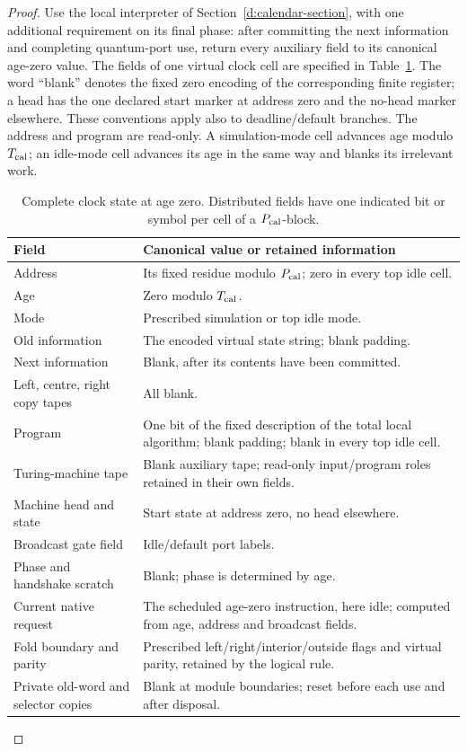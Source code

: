 \begin{proof}
Use the local interpreter of Section~\ref{d:calendar-section}, with
one additional requirement on its final phase: after committing the
next information and completing quantum-port use, return every
auxiliary field to its canonical age-zero value. The fields of one
virtual clock cell are specified in Table~\ref{f4:fields}. The
word ``blank'' denotes the fixed zero encoding of the corresponding
finite register; a head has the one declared start marker at address
zero and the no-head marker elsewhere. These conventions apply also
to deadline/default branches. The address and program are read-only.
A simulation-mode cell advances age modulo \(T_{\rm cal}\); an idle-mode cell
advances its age in the same way and blanks its irrelevant work.

\begin{table}[!htp]
\caption{Complete clock state at age zero. Distributed fields have
one indicated bit or symbol per cell of a \(P_{\rm cal}\)-block.}\label{f4:fields}
\small\centering
\begin{tabular}{@{}p{}>{\raggedright\arraybackslash}p{}@{}}
\toprule Field & Canonical value or retained information\\\midrule
Address & Its fixed residue modulo \(P_{\rm cal}\); zero in every top idle cell.\\\addlinespace[3pt]
Age & Zero modulo \(T_{\rm cal}\).\\\addlinespace[3pt]
Mode & Prescribed simulation or top idle mode.\\\addlinespace[3pt]
Old information & The encoded virtual state string; blank padding.\\\addlinespace[3pt]
Next information & Blank, after its contents have been committed.\\\addlinespace[3pt]
Left, centre, right copy tapes & All blank.\\\addlinespace[3pt]
Program & One bit of the fixed description of the total local algorithm;
blank padding; blank in every top idle cell.\\\addlinespace[3pt]
Turing-machine tape & Blank auxiliary tape; read-only input/program roles retained
in their own fields.\\\addlinespace[3pt]
Machine head and state & Start state at address zero, no head elsewhere.\\\addlinespace[3pt]
Broadcast gate field & Idle/default port labels.\\\addlinespace[3pt]
Phase and handshake scratch & Blank; phase is determined by age.\\\addlinespace[3pt]
Current native request & The scheduled age-zero instruction, here idle;
computed from age, address and broadcast fields.\\\addlinespace[3pt]
Fold boundary and parity & Prescribed left/right/interior/outside flags
and virtual parity, retained by the logical rule.\\\addlinespace[3pt]
Private old-word and selector copies & Blank at module boundaries;
reset before each use and after disposal.\\\bottomrule
\end{tabular}
\end{table}


\end{proof}
